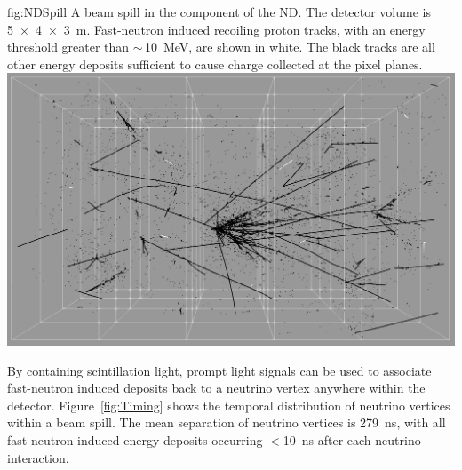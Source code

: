 \begin{dunefigure}{fig:NDSpill}
{A beam spill in the  component of the  ND. 
		The detector volume is \SI[product-units=repeat]{5x4x3}{\metre}.
		Fast-neutron induced recoiling proton tracks, with an energy threshold greater than $\sim\,$\SI{10}{\mega\electronvolt}, are shown in white.
		The black tracks are all other energy deposits sufficient to cause charge collected at the pixel planes.}
\includegraphics[width=.7\textwidth]{graphics/NeutronNDSpill.png}
\end{dunefigure}

By containing scintillation light, prompt light signals can be used to associate fast-neutron induced deposits back to a neutrino vertex anywhere within the detector.
Figure~\ref{fig:Timing} shows the temporal distribution of neutrino vertices within a beam spill.
The mean separation of neutrino vertices is \SI{279}{\nano\second}, with all fast-neutron induced energy deposits occurring $<$\SI{10}{\nano\second} after each neutrino interaction.      

